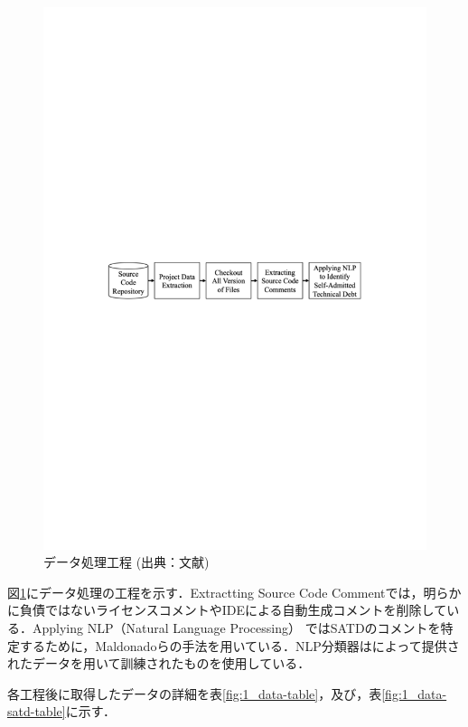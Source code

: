\begin{figure}[t]
    \centering
    \includegraphics[width=0.9\linewidth, angle=0]{./thesis1/data-preprocess1.pdf}
    \caption{データ処理工程 (出典：文献\cite{satd-removal})}
    \label{fig:1_data-preprocess}
\end{figure}

図\ref{fig:1_data-preprocess}にデータ処理の工程を示す．Extractting Source Code Commentでは，明らかに負債ではないライセンスコメントやIDEによる自動生成コメントを削除している．Applying NLP（Natural Language Processing） ではSATDのコメントを特定するために，Maldonadoら\cite{1-ref-25}の手法を用いている．NLP分類器は\cite{1-ref-25}によって提供されたデータを用いて訓練されたものを使用している．

各工程後に取得したデータの詳細を表\ref{fig:1_data-table}，及び，表\ref{fig:1_data-satd-table}に示す．

